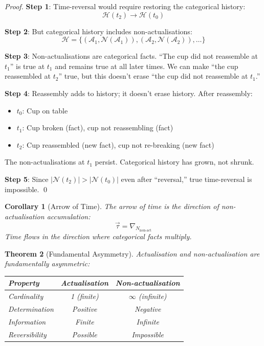 \documentclass[twocolumn,10pt]{article}
\newtheorem{theorem}{Theorem}[section]
\newtheorem{corollary}[theorem]{Corollary}
\theoremstyle{definition}
\theoremstyle{remark}
\begin{document}
\begin{proof}
\textbf{Step 1}: Time-reversal would require restoring the categorical history:
\begin{equation}
\mathcal{H}(t_2) \to \mathcal{H}(t_0)
\end{equation}

\textbf{Step 2}: But categorical history includes non-actualisations:
\begin{equation}
\mathcal{H} = \{(\mathcal{A}_1, \mathcal{N}(\mathcal{A}_1)), (\mathcal{A}_2, \mathcal{N}(\mathcal{A}_2)), \ldots\}
\end{equation}

\textbf{Step 3}: Non-actualisations are categorical facts. ``The cup did not reassemble at $t_1$'' is true at $t_1$ and remains true at all later times. We can make ``the cup reassembled at $t_2$'' true, but this doesn't erase ``the cup did not reassemble at $t_1$.''

\textbf{Step 4}: Reassembly adds to history; it doesn't erase history. After reassembly:
\begin{itemize}
\item $t_0$: Cup on table
\item $t_1$: Cup broken (fact), cup not reassembling (fact)
\item $t_2$: Cup reassembled (new fact), cup not re-breaking (new fact)
\end{itemize}

The non-actualisations at $t_1$ persist. Categorical history has grown, not shrunk.

\textbf{Step 5}: Since $|\mathcal{N}(t_2)| > |\mathcal{N}(t_0)|$ even after ``reversal,'' true time-reversal is impossible. \qed
\end{proof}

\begin{corollary}[Arrow of Time]
\label{cor:arrow}
The arrow of time is the direction of non-actualisation accumulation:
\begin{equation}
\vec{\tau} = \nabla_{N_{\text{non-act}}}
\end{equation}
Time flows in the direction where categorical facts multiply.
\end{corollary}

\begin{theorem}[Fundamental Asymmetry]
\label{thm:asymmetry}
Actualisation and non-actualisation are fundamentally asymmetric:

\begin{center}
\begin{tabular}{lcc}
\toprule
\textbf{Property} & \textbf{Actualisation} & \textbf{Non-actualisation} \\
\midrule
Cardinality & 1 (finite) & $\infty$ (infinite) \\
Determination & Positive & Negative \\
Information & Finite & Infinite \\
Reversibility & Possible & Impossible \\
\bottomrule
\end{tabular}
\end{center}
\end{theorem}
\end{document}
